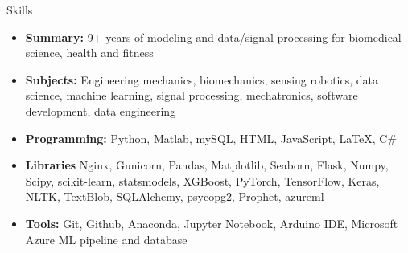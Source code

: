 \documentclass{resume} %
\begin{document}
	\begin{rSection}{Skills}
		\begin{itemize}[leftmargin=0em]
			\item {\bf Summary: }{9+ years of modeling and data/signal processing for biomedical science, health and fitness}
			\item {\bf Subjects: }{Engineering mechanics, biomechanics, sensing robotics, data science, machine learning, signal processing, mechatronics, software development, data engineering}
			\item {\bf Programming:}{ Python, Matlab, mySQL, HTML, JavaScript, LaTeX, C\#}
			\item {\bf Libraries}{ Nginx, Gunicorn, Pandas, Matplotlib, Seaborn, Flask, Numpy, Scipy, scikit-learn, statsmodels, XGBoost, PyTorch, TensorFlow, Keras, NLTK, TextBlob, SQLAlchemy, psycopg2, Prophet, azureml}
			\item {\bf Tools:}{ Git, Github, Anaconda, Jupyter Notebook, Arduino IDE, Microsoft Azure ML pipeline and database} %
			
		\end{itemize}
	\end{rSection}
	
\end{document}
